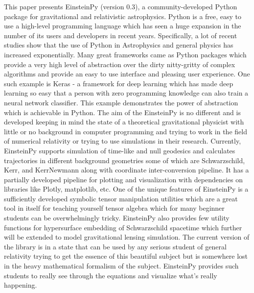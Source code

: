\documentclass[onecolumn]{aa}
\begin{document}
 
  \abstract
{This paper presents EinsteinPy (version 0.3), a community-developed Python package for gravitational and relativistic astrophysics. Python is a free, easy to use a high-level programming language which has seen a huge expansion in the number of its users and developers in recent years. Specifically, a lot of recent studies show that the use of Python in Astrophysics and general physics has increased exponentially. Many great frameworks came as Python packages which provide a very high level of abstraction over the dirty nitty-gritty of complex algorithms and provide an easy to use interface and pleasing user experience. One such example is Keras - a framework for deep learning which has made deep learning so easy that a person with zero programming knowledge can also train a neural network classifier. This example demonstrates the power of abstraction which is achievable in Python. The aim of the EinsteinPy is no different and is developed keeping in mind the state of a theoretical gravitational physicist with little or no background in computer programming and trying to work in the field of numerical relativity or trying to use simulations in their research. Currently, EinsteinPy supports simulation of time-like and null geodesics and calculates trajectories in different background geometries some of which are Schwarzschild, Kerr, and KerrNewmann along with coordinate inter-conversion pipeline. It has a partially developed pipeline for plotting and visualization with dependencies on libraries like Plotly, matplotlib, etc. One of the unique features of EinsteinPy is a sufficiently developed symbolic tensor manipulation utilities which are a great tool in itself for teaching yourself tensor algebra which for many beginner students can be overwhelmingly tricky. EinsteinPy also provides few utility functions for hypersurface embedding of Schwarzschild spacetime which further will be extended to model gravitational lensing simulation. The current version of the library is in a state that can be used by any serious student of general relativity trying to get the essence of this beautiful subject but is somewhere lost in the heavy mathematical formalism of the subject. EinsteinPy provides such students to really see through the equations and visualize what's really happening.}


   \maketitle
%
\end{document}
